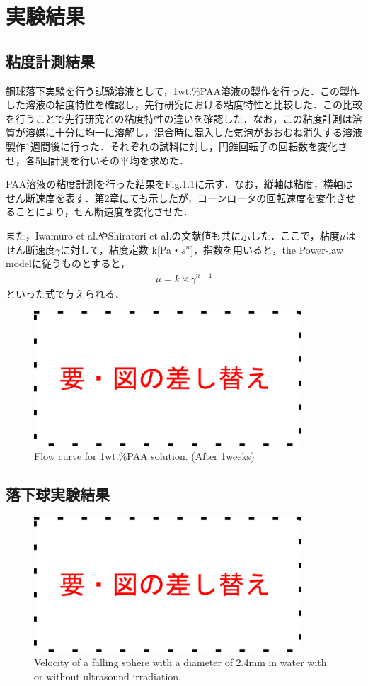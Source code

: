 \chapter{実験結果}
\section{粘度計測結果}
鋼球落下実験を行う試験溶液として，1wt.\%PAA溶液の製作を行った．この製作した溶液の粘度特性を確認し，先行研究\cite{ref:9}\cite{ref:10}における粘度特性と比較した．この比較を行うことで先行研究との粘度特性の違いを確認した．なお，この粘度計測は溶質が溶媒に十分に均一に溶解し，混合時に混入した気泡がおおむね消失する溶液製作1週間後に行った．それぞれの試料に対し，円錐回転子の回転数を変化させ，各5回計測を行いその平均を求めた．

PAA溶液の粘度計測を行った結果をFig.\ref{fig:PAA-vis}に示す．なお，縦軸は粘度，横軸はせん断速度を表す．第2章にても示したが，コーンロータの回転速度を変化させることにより，せん断速度を変化させた．

また，Iwamuro et al.\cite{ref:9}やShiratori et al.\cite{ref:10}の文献値も共に示した．ここで，粘度$\mu$はせん断速度$\dot{\gamma}$に対して，粘度定数 k[Pa・$s^n$]，指数を用いると，the Power-law modelに従うものとすると，
\begin{eqnarray}
    \mu=k\times\dot{\gamma}^{n-1}
\end{eqnarray}
といった式で与えられる\cite{ref:1}．

\begin{figure}[h]
    \centering
    \includegraphics[width=10cm,clip]{tmp.png}
    \caption{Flow curve for 1wt.\%PAA solution. (After 1weeks)}
    \label{fig:PAA-vis}
\end{figure}

\section{落下球実験結果}

\begin{figure}[h]
    \centering
    \includegraphics[width=10cm,clip]{tmp.png}
    \caption{Velocity of a falling sphere with a diameter of 2.4mm in water with or without ultrasound irradiation.}
    \label{fig:water}
\end{figure}

